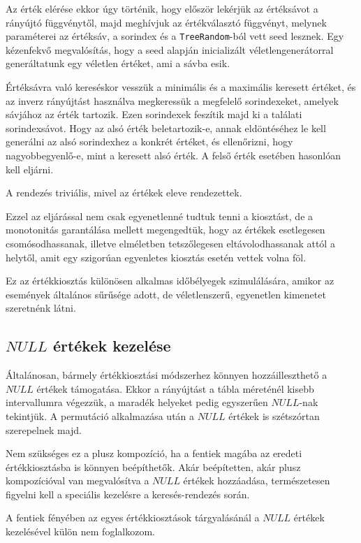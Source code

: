 \documentclass[
    parspace,
    noindent,
    nohyp,
]{elteiktdk}[2023/04/10]
\begin{document}
Az érték elérése ekkor úgy történik, hogy először lekérjük az értéksávot a rányújtó függvénytől,
majd meghívjuk az értékválasztó függvényt,
melynek paraméterei az értéksáv, a sorindex és a \texttt{TreeRandom}-ból vett seed lesznek.
Egy kézenfekvő megvalósítás,
hogy a seed alapján inicializált véletlengenerátorral
generáltatunk egy véletlen értéket, ami a sávba esik.

Értéksávra való kereséskor vesszük a minimális és a maximális keresett értéket,
és az inverz rányújtást használva megkeressük a megfelelő sorindexeket,
amelyek sávjához az érték tartozik.
Ezen sorindexek feszítik majd ki a találati sorindexsávot.
Hogy az alsó érték beletartozik-e, annak eldöntéséhez le kell generálni
az alsó sorindexhez a konkrét értéket, és ellenőrizni, hogy nagyobbegyenlő-e,
mint a keresett alsó érték.
A felső érték esetében hasonlóan kell eljárni.

A rendezés triviális, mivel az értékek eleve rendezettek.

Ezzel az eljárással nem csak egyenetlenné tudtuk tenni a kiosztást,
de a monotonitás garantálása mellett megengedtük,
hogy az értékek esetlegesen csomósodhassanak,
illetve elméletben tetszőlegesen eltávolodhassanak attól a helytől,
amit egy szigorúan egyenletes kiosztás esetén vettek volna föl.

Ez az értékkiosztás különösen alkalmas időbélyegek szimulálására,
amikor az események általános sűrűsége adott,
de véletlenszerű, egyenetlen kimenetet szeretnénk látni.

\subsection{$NULL$ értékek kezelése}

Általánosan, bármely értékkiosztási módszerhez könnyen hozzáilleszthető a $NULL$ értékek támogatása.
Ekkor a rányújtást a tábla méreténél kisebb intervallumra végezzük,
a maradék helyeket pedig egyszerűen $NULL$-nak tekintjük.
A permutáció alkalmazása után a $NULL$ értékek is szétszórtan szerepelnek majd.

Nem szükséges ez a plusz kompozíció,
ha a fentiek magába az eredeti értékkiosztásba is könnyen beépíthetők.
Akár beépítetten, akár plusz kompozícióval van megvalósítva a $NULL$ értékek hozzáadása,
természetesen figyelni kell a speciális kezelésre a keresés-rendezés során.

A fentiek fényében az egyes értékkiosztások tárgyalásánál
a $NULL$ értékek kezelésével külön nem foglalkozom.
\end{document}
